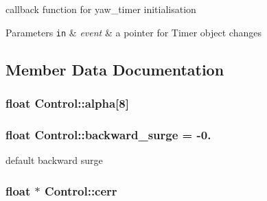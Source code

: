 callback function for yaw\+\_\+timer initialisation 


\begin{DoxyParams}[1]{Parameters}
\mbox{\tt in}  & {\em event} & a pointer for Timer object changes \\
\hline
\end{DoxyParams}


\subsection{Member Data Documentation}
\subsubsection[{\texorpdfstring{alpha}{alpha}}]{\setlength{\rightskip}{0pt plus 5cm}float Control\+::alpha\mbox{[}8\mbox{]}\hspace{0.3cm}{\ttfamily [private]}}\hypertarget{classControl_a9d9f9a31c555e320a948d062f7435edf}{}\label{classControl_a9d9f9a31c555e320a948d062f7435edf}
\subsubsection[{\texorpdfstring{backward\+\_\+surge}{backward_surge}}]{\setlength{\rightskip}{0pt plus 5cm}float Control\+::backward\+\_\+surge = -\/0.\hspace{0.3cm}{\ttfamily [private]}}\hypertarget{classControl_a365181f0a2e284023f1bffcb91628f67}{}\label{classControl_a365181f0a2e284023f1bffcb91628f67}


default backward surge 

\subsubsection[{\texorpdfstring{cerr}{cerr}}]{\setlength{\rightskip}{0pt plus 5cm}float $\ast$ Control\+::cerr\hspace{0.3cm}{\ttfamily [private]}}\hypertarget{classControl_a5b9e1402c27f26e5cc84d1e17a2d83b7}{}\label{classControl_a5b9e1402c27f26e5cc84d1e17a2d83b7}
